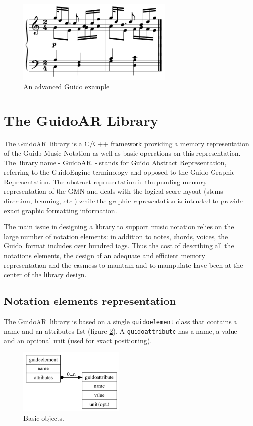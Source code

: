 \documentclass{article}
\newcommand{\Guido}	{Guido}
\newcommand{\GAR}		{GuidoAR}
\newcommand{\code}[1]	{{\small \texttt{#1}}}
\begin{document}
\begin{figure}[h]
	\centering \includegraphics[width=77mm]{rsrc/4voices}
 \caption{An advanced Guido example}
 \label{advex}
\end{figure}



\section{The GuidoAR Library}
The \GAR\ library is a C/C++ framework providing a memory representation of the Guido Music Notation as well as basic operations on this representation. The library name - \GAR\ - stands for Guido Abstract Representation, referring to the \Guido Engine \cite{RENZ02} \cite{Fober:04b} terminology and opposed to the Guido Graphic Representation. The abstract representation is the pending memory representation of the GMN and deals with the logical score layout (stems direction, beaming, etc.) while the graphic representation is intended to provide exact graphic formatting information.

The main issue in designing a library to support music notation relies on the large number of notation elements: in addition to notes, chords, voices, the \Guido\ format includes over hundred tags. Thus the cost of describing all the notations elements, the design of an adequate and efficient memory representation and the easiness to maintain and to manipulate have been at the center of the library design.

\subsection{Notation elements representation}
The \GAR\ library is based on a single \code{guidoelement} class that contains a name and an attributes list (figure \ref{guidoelt}). A \code{guidoattribute} has a name, a value and an optional unit (used for exact positioning).
\begin{figure}[htbp]
	\begin{center}
	\includegraphics[width=5.2cm]{rsrc/guidoelt}
	\caption{Basic objects.}
	\label{guidoelt}
	\end{center}
\end{figure}
\end{document}
